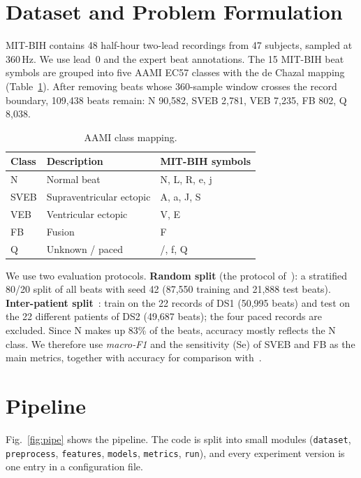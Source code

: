 \documentclass[journal]{IEEEtran}
\begin{document}
\section{Dataset and Problem Formulation}\label{sec:data}
MIT-BIH contains 48 half-hour two-lead recordings from 47 subjects, sampled at 360\,Hz. We use lead~0 and the expert beat annotations. The 15 MIT-BIH beat symbols are grouped into five AAMI EC57 classes with the de Chazal mapping (Table~\ref{tab:aami}). After removing beats whose 360-sample window crosses the record boundary, 109{,}438 beats remain: N 90{,}582, SVEB 2{,}781, VEB 7{,}235, FB 802, Q 8{,}038.

\begin{table}[t]
\centering
\caption{AAMI class mapping.}\label{tab:aami}
\begin{tabular}{lll}
\toprule
Class & Description & MIT-BIH symbols\\
\midrule
N & Normal beat & N, L, R, e, j\\
SVEB & Supraventricular ectopic & A, a, J, S\\
VEB & Ventricular ectopic & V, E\\
FB & Fusion & F\\
Q & Unknown / paced & /, f, Q\\
\bottomrule
\end{tabular}
\end{table}

We use two evaluation protocols.
\textbf{Random split} (the protocol of~\cite{subba2024}): a stratified 80/20 split of all beats with seed 42 (87{,}550 training and 21{,}888 test beats).
\textbf{Inter-patient split}~\cite{dechazal2004}: train on the 22 records of DS1 (50{,}995 beats) and test on the 22 different patients of DS2 (49{,}687 beats); the four paced records are excluded.
Since N makes up 83\% of the beats, accuracy mostly reflects the N class. We therefore use \emph{macro-F1} and the sensitivity (Se) of SVEB and FB as the main metrics, together with accuracy for comparison with~\cite{subba2024}.

\section{Pipeline}\label{sec:method}
Fig.~\ref{fig:pipe} shows the pipeline. The code is split into small modules (\texttt{dataset}, \texttt{preprocess}, \texttt{features}, \texttt{models}, \texttt{metrics}, \texttt{run}), and every experiment version is one entry in a configuration file.
\end{document}

